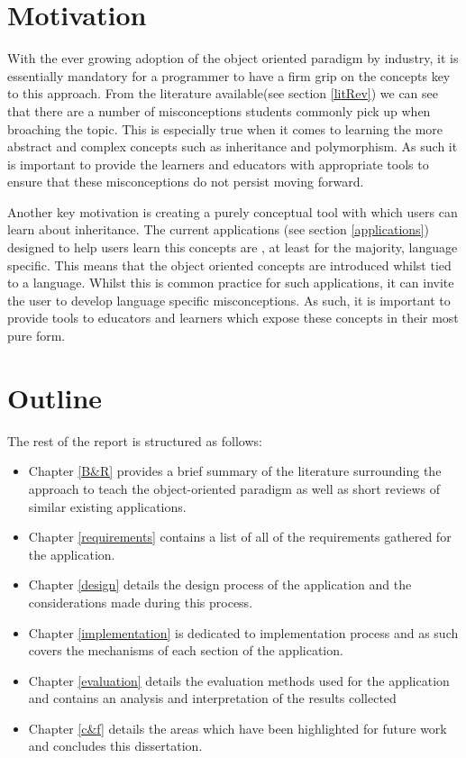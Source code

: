 \documentclass{l4proj}
\begin{document}
\section{Motivation}

With the ever growing adoption of the object oriented paradigm by industry, it is essentially mandatory for a programmer to have a firm grip on the concepts key to this approach. From the literature available(see section \ref{litRev}) we can see that there are a number of misconceptions students commonly pick up when broaching the topic. This is especially true when it comes to learning the more abstract and complex concepts such as inheritance and polymorphism. As such it is important to provide the learners and educators with appropriate tools to ensure that these misconceptions do not persist moving forward.

Another key motivation is creating a purely conceptual tool with which users can learn about inheritance. The current applications (see section \ref{applications}) designed to help users learn this concepts are , at least for the majority, language specific. This means that the object oriented concepts are introduced whilst tied to a language. Whilst this is common practice for such applications, it can invite the user to develop language specific misconceptions. As such, it is important to provide tools to educators and learners which expose these concepts in their most pure form. 

\section{Outline}

The rest of the report is structured as follows:
\begin{itemize}
\item Chapter \ref{B&R} provides a brief summary of the literature surrounding the approach to teach the object-oriented paradigm as well as short reviews of similar existing applications.
\item Chapter \ref{requirements} contains a list of all of the requirements gathered for the application. 
\item Chapter \ref{design} details the design process of the application and the considerations made during this process. 
\item Chapter \ref{implementation} is dedicated to implementation process and as such covers the mechanisms of each section of the application. 
\item Chapter \ref{evaluation} details the evaluation methods used for the application and contains an analysis and interpretation of the results collected
\item Chapter \ref{c&f} details the areas which have been highlighted for future work and concludes this dissertation. 

\end{itemize}
\end{document}
